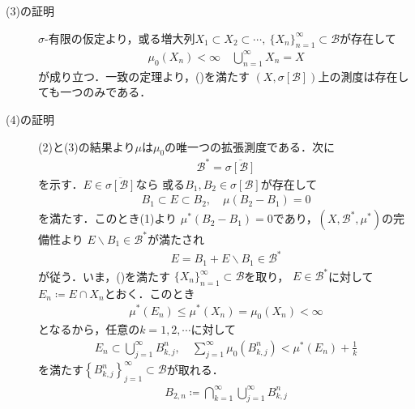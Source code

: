 \begin{prf}
\begin{description}
				\item[(3)の証明]
					$\sigma$-有限の仮定より，或る増大列$X_1 \subset X_2 \subset \cdots
					,\ \{X_n\}_{n=1}^\infty \subset \mathcal{B}$が存在して
					\begin{align}
						\mu_0 (X_n) < \infty \quad \bigcup_{n=1}^\infty X_n = X
						\label{eq:appendix_finite_additive_measure_expansion_3}
					\end{align}
					が成り立つ．一致の定理より，()を満たす
					$\left( X,\sigma[\mathcal{B}] \right)$上の測度は存在しても一つのみである．
					
				\item[(4)の証明]
					(2)と(3)の結果より$\mu$は$\mu_0$の唯一つの拡張測度である．次に
					\begin{align}
						\mathcal{B}^* = \overline{\sigma[\mathcal{B}]}
						\label{eq:appendix_finite_additive_measure_expansion_4}
					\end{align}
					を示す．$E \in \overline{\sigma[\mathcal{B}]}$なら
					或る$B_1,B_2 \in \sigma[\mathcal{B}]$が存在して
					\begin{align}
						B_1 \subset E \subset B_2, \quad \mu(B_2 - B_1) = 0
					\end{align}
					を満たす．このとき(1)より
					$\mu^*(B_2 - B_1) = 0$であり，$\left( X,\mathcal{B}^*,\mu^* \right)$の完備性より
					$E \backslash B_1 \in \mathcal{B}^*$が満たされ
					\begin{align}
						E = B_1 + E \backslash B_1 \in \mathcal{B}^*
					\end{align}
					が従う．いま，()を満たす
					$\{X_n\}_{n=1}^\infty \subset \mathcal{B}$を取り，
					$E \in \mathcal{B}^*$に対して$E_n \coloneqq E \cap X_n$とおく．このとき
					\begin{align}
						\mu^*(E_n) \leq \mu^*(X_n) = \mu_0(X_n) < \infty
					\end{align}
					となるから，任意の$k = 1,2,\cdots$に対して
					\begin{align}
						E_n \subset \bigcup_{j=1}^\infty B^n_{k,j},
						\quad
						\sum_{j=1}^\infty \mu_0\left( B^n_{k,j} \right)
						< \mu^*(E_n) + \frac{1}{k}
					\end{align}
					を満たす$\left\{B^n_{k,j}\right\}_{j=1}^\infty \subset \mathcal{B}$が取れる．
					\begin{align}
						B_{2,n} \coloneqq \bigcap_{k=1}^\infty \bigcup_{j=1}^\infty B^n_{k,j}
					\end{align}

\end{description}
\end{prf}
